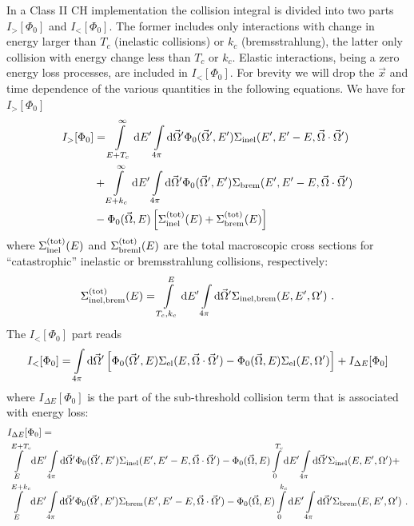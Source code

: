 In a Class II CH implementation the collision integral 
is divided into two parts $I_>[\Phi_0]$ and $I_<[\Phi_0]$. 
The former includes only interactions 
with change in energy larger than $T_c$ (inelastic collisions) 
or $k_c$ (bremsstrahlung), the latter only 
collision with energy change less than 
$T_c$ or $k_c$. Elastic interactions, 
being a zero energy loss processes, are included in $I_<[\Phi_0]$. 
For brevity we will drop the $\vec{x}$ and time dependence of the 
various quantities in the following equations. 
We have for $I_>[\Phi_0]$
\begin{equation}
\begin{split}
I_>[\Phi_0] & = \int\limits_{E+T_c}^\infty {\rm d}E' \int\limits_{4 \pi}
{\rm d} \vec{\Omega}' \Phi_0(\vec{\Omega}',E') 
\Sigma_{\rm inel}(E',E'-E,\vec{\Omega}\cdot\vec{\Omega}') \\
& + \int\limits_{E+k_c}^\infty {\rm d}E' \int\limits_{4 \pi} 
{\rm d} \vec{\Omega}' \Phi_0(\vec{\Omega}',E') 
\Sigma_{\rm brem}(E',E'-E,\vec{\Omega}\cdot\vec{\Omega}')
\\
& - \Phi_0(\vec{\Omega},E) 
\left[ \Sigma_{\rm inel}^{\rm (tot)}(E) + \Sigma_{\rm brem}^{\rm (tot)}(E)
\right]
\end{split}
\end{equation}
where $\Sigma_{\rm inel}^{\rm (tot)}(E)$ and 
$\Sigma_{\rm breml}^{\rm (tot)}(E)$ are the total macroscopic 
cross sections for ``catastrophic'' inelastic or bremsstrahlung 
collisions, respectively:
\begin{equation}
\Sigma_{\rm inel,brem}^{\rm (tot)}(E) = \int\limits_{T_c,k_c}^E {\rm d} E' 
\int\limits_{4 \pi} {\rm d}\vec{\Omega}' 
\Sigma_{\rm inel,brem}(E,E',\Omega')~.
\end{equation}
The $I_<[\Phi_0]$ part reads
\begin{equation}
I_<[\Phi_0] = \int\limits_{4 \pi} {\rm d}\vec{\Omega}' 
\left[ \Phi_0(\vec{\Omega}',E) 
\Sigma_{\rm el}(E,\vec{\Omega}\cdot\vec{\Omega}') - 
\Phi_0(\vec{\Omega},E) \Sigma_{\rm el}(E,\Omega') \right] + 
I_{\Delta E}[\Phi_0]
\end{equation}
where $I_{\Delta E}[\Phi_0]$ is the part of the sub-threshold 
collision term that is associated with energy loss: 
\begin{equation}
\begin{split}
\label{I_deltaE1}
& 
I_{\Delta E}[\Phi_0] = \\
& 
 \int\limits_E^{E+T_c} {\rm d}E' \int\limits_{4 \pi} 
{\rm d}\vec{\Omega}'\Phi_0(\vec{\Omega}',E') 
\Sigma_{\rm inel}(E',E'-E,\vec{\Omega}\cdot\vec{\Omega}') - 
\Phi_0(\vec{\Omega},E)
\int\limits_0^{T_c} {\rm d}E' \int\limits_{4 \pi} {\rm d}\vec{\Omega}' 
\Sigma_{\rm inel}(E,E',\Omega') + \\
& 
\int\limits_E^{E+k_c} {\rm d}E' \int\limits_{4 \pi} 
{\rm d}\vec{\Omega}'\Phi_0(\vec{\Omega}',E') 
\Sigma_{\rm brem} (E',E'-E,\vec{\Omega}\cdot\vec{\Omega}') - 
\Phi_0(\vec{\Omega},E)
\int\limits_0^{k_c} {\rm d}E' \int\limits_{4 \pi} {\rm d}\vec{\Omega}' 
\Sigma_{\rm brem}(E,E',\Omega')~. 
\end{split}
\end{equation}
